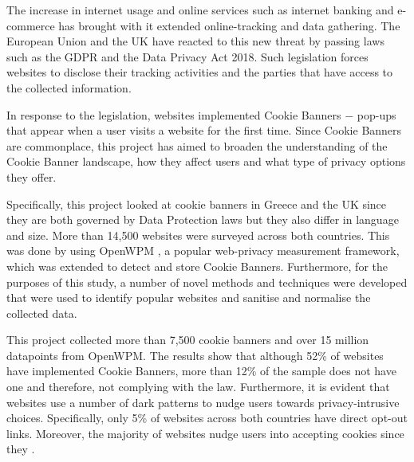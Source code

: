 \documentclass[../main.tex]{subfiles}
\begin{document}
The increase in internet usage and online services such as internet banking and e-commerce has brought with it extended online-tracking and data gathering. The European Union and the UK have reacted to this new threat by passing laws such as the GDPR and the Data Privacy Act 2018. Such legislation forces websites to disclose their tracking activities and the parties that have access to the collected information. 

In response to the legislation, websites implemented Cookie Banners $-$ pop-ups that appear when a user visits a website for the first time. Since Cookie Banners are commonplace, this project has aimed to broaden the understanding of the Cookie Banner landscape, how they affect users and what type of privacy options they offer.

Specifically, this project looked at cookie banners in Greece and the UK since they are both governed by Data Protection laws but they also differ in language and size. More than 14,500 websites were surveyed across both countries. This was done by using OpenWPM \cite{englehardt2016online}, a popular web-privacy measurement framework, which was extended to detect and store Cookie Banners. Furthermore, for the purposes of this study, a number of novel methods and techniques were developed that were used to identify popular websites and sanitise and normalise the collected data.

This project collected more than 7,500 cookie banners and over 15 million datapoints from OpenWPM. The results show that although 52\% of websites have implemented Cookie Banners, more than 12\% of the sample does not have one and therefore, not complying with the law. Furthermore, it is evident that websites use a number of dark patterns to nudge users towards privacy-intrusive choices. Specifically, only 5\% of websites across both countries have direct opt-out links. Moreover, the majority of websites nudge users into accepting cookies since they .
\end{document}
